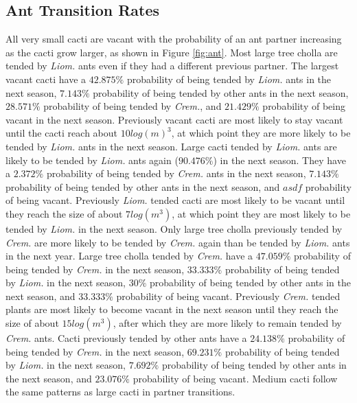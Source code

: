 \documentclass[12pt,a4paper]{article}
\begin{document}
\subsection*{Ant Transition Rates}
All very small cacti are vacant with the probability of an ant partner increasing as the cacti grow larger, as shown in Figure \ref{fig:ant}. 
Most large tree cholla are tended by \textit{Liom.} ants even if they had a different previous partner.
The largest vacant cacti have a $42.875\%$ probability of being tended by \textit{Liom.} ants in the next season, $7.143\%$ probability of being tended by other ants in the next season, $28.571\%$ probability of being tended by \textit{Crem.}, and $21.429\%$ probability of being vacant in the next season.
Previously vacant cacti are most likely to stay vacant until the cacti reach about $10 log(m)^3$, at which point they are more likely to be tended by \textit{Liom.} ants in the next season. 
Large cacti tended by \textit{Liom.} ants are likely to be tended by \textit{Liom.} ants again ($90.476\%$) in the next season.
They have a $2.372\%$ probability of being tended by \textit{Crem.} ants in the next season, $7.143\%$ probability of being tended by other ants in the next season, and $asdf$ probability of being vacant.  
Previously \textit{Liom.} tended cacti are most likely to be vacant until they reach the size of about $7 log(m^3)$, at which point they are most likely to be tended by \textit{Liom.} in the next season.
Only large tree cholla previously tended by \textit{Crem.} are more likely to be tended by \textit{Crem.} again than be tended by \textit{Liom.} ants in the next year. 
Large tree cholla tended by \textit{Crem.} have a $47.059\%$ probability of being tended by \textit{Crem.} in the next season, $33.333\%$ probability of being tended by \textit{Liom.} in the next season, $30\%$ probability of being tended by other ants in the next season, and $33.333\%$ probability of being vacant. 
Previously \textit{Crem.} tended plants are most likely to become vacant in the next season until they reach the size of about $15 log(m^3)$, after which they are more likely to remain tended by \textit{Crem.} ants. 
Cacti previously tended by other ants have a $24.138\%$ probability of being tended by \textit{Crem.} in the next season, $69.231\%$ probability of being tended by \textit{Liom.} in the next season, $7.692\%$ probability of being tended by other ants in the next season, and $23.076\%$ probability of being vacant. 
Medium cacti follow the same patterns as large cacti in partner transitions. 
\end{document}
